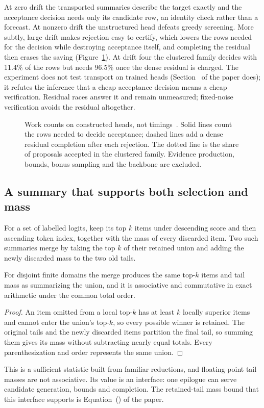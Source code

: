 At zero drift the transported summaries describe the target exactly and the acceptance decision needs only its candidate row, an identity check rather than a forecast. At nonzero drift the unstructured head defeats greedy screening. More subtly, large drift makes rejection easy to certify, which lowers the rows needed for the decision while destroying acceptance itself, and completing the residual then erases the saving (Figure~\ref{fig:synthetic}). At drift four the clustered family decides with 11.4\% of the rows but needs 96.5\% once the dense residual is charged. The experiment does not test transport on trained heads (Section~ of the paper does); it refutes the inference that a cheap acceptance decision means a cheap verification. Residual races answer it and remain unmeasured; fixed-noise verification avoids the residual altogether.

\begin{figure}[htbp]
\centering
%
\caption{Work counts on constructed heads, not timings~. Solid lines count the rows needed to decide acceptance; dashed lines add a dense residual completion after each rejection. The dotted line is the share of proposals accepted in the clustered family. Evidence production, bounds, bonus sampling and the backbone are excluded.}
\label{fig:synthetic}
\end{figure}

\subsection{A summary that supports both selection and mass}\label{app:summary}
For a set of labelled logits, keep its top $k$ items under descending score and then ascending token index, together with the mass of every discarded item. Two such summaries merge by taking the top $k$ of their retained union and adding the newly discarded mass to the two old tails.
\begin{proposition}\label{prop:summary}
For disjoint finite domains the merge produces the same top-$k$ items and tail mass as summarizing the union, and it is associative and commutative in exact arithmetic under the common total order.
\end{proposition}
\begin{proof}
An item omitted from a local top-$k$ has at least $k$ locally superior items and cannot enter the union's top-$k$, so every possible winner is retained. The original tails and the newly discarded items partition the final tail, so summing them gives its mass without subtracting nearly equal totals. Every parenthesization and order represents the same union.
\end{proof}
This is a sufficient statistic built from familiar reductions, and floating-point tail masses are not associative. Its value is an interface: one epilogue can serve candidate generation, bounds and completion. The retained-tail mass bound that this interface supports is Equation~() of the paper.

